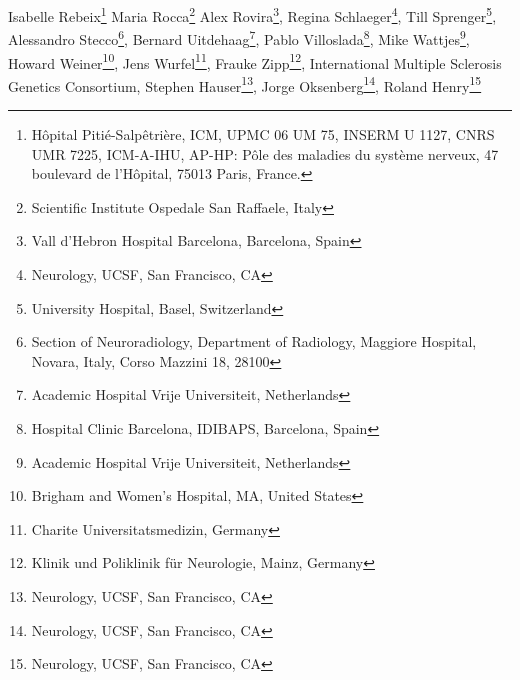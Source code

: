 Isabelle Rebeix\footnote[9]{Hôpital Pitié-Salpêtrière, ICM, UPMC 06 UM 75, INSERM U 1127, CNRS UMR 7225, ICM-A-IHU, AP-HP:  
Pôle des maladies du système nerveux, 47 boulevard de l'Hôpital, 75013  
Paris, France.}
Maria Rocca\footnote[8]{Scientific Institute Ospedale San Raffaele, Italy}
Alex Rovira\footnote[5]{Vall d’Hebron Hospital Barcelona, Barcelona, Spain},
Regina Schlaeger\footnote[1]{Neurology, UCSF, San Francisco, CA},
Till Sprenger\footnote[13]{University Hospital, Basel, Switzerland},
Alessandro Stecco\footnote[6]{Section of Neuroradiology, Department of Radiology, Maggiore Hospital, Novara, Italy, Corso Mazzini 18, 28100},
Bernard Uitdehaag\footnote[16]{Academic Hospital Vrije Universiteit, Netherlands},
Pablo Villoslada\footnote[14]{Hospital Clinic Barcelona, IDIBAPS, Barcelona, Spain},
Mike Wattjes\footnote[16]{Academic Hospital Vrije Universiteit, Netherlands},
Howard Weiner\footnote[4]{Brigham and Women's Hospital, MA, United States},
Jens Wurfel\footnote[2]{Charite Universitatsmedizin, Germany},
Frauke Zipp\footnote[10]{Klinik und Poliklinik für Neurologie, Mainz, Germany},
International Multiple Sclerosis Genetics Consortium,
Stephen Hauser\footnote[1]{Neurology, UCSF, San Francisco, CA},
Jorge Oksenberg\footnote[1]{Neurology, UCSF, San Francisco, CA},
Roland Henry\footnote[1]{Neurology, UCSF, San Francisco, CA}

\else %
\author[1]{Anisha Keshavan}
\author[2]{Friedmann Paul}
\author[3]{Mona K. Beyer}
\author[1]{Alyssa Zhu}
\author[1]{Nico Papinutto}
\author[1]{William Stern}
\author[13]{Michael Aman}
\author[4]{Rohit Bakshi}
\author[1]{Antje Bischof}
\author[6] {Alessandro Carriero}
\author[5]{Manuel Comabella}
\author[1]{Jason C. Crane}
\author[6]{Sandra D’Alfonso}
\author[7]{Benedicte Dubois}
\author[8]{Massimo Filippi}
\author[9]{Bertrand Fontaine}
\author[7]{Ann Goris}
\author[13]{Laura Gaetano}
\author[10]{Sergiu Groppa}
\author[11]{David Hafler}
\author[3]{Hanne F. Harbo}
\author[12]{Bernhard Hemmer}
\author[1]{Kesshi Jordan}
\author[13]{Ludwig Kappos}
\author[1]{Gina Kirkish}
\author[14]{Sara Llufriu}
\author[13]{Stefano Magon}
\author[8]{Filippo Martinelli-Boneschi}
\author[15]{Jacob McCauley}
\author[5]{Xavier Montalban}
\author[12]{Mark Muhlau}
\author[11]{Daniel Pelletier} %
\author[15]{Margaret Pericak-Vance}
\author[9]{Isabelle Rebeix}
\author[8]{Maria Rocca}
\author[5]{Alex Rovira}
\author[1]{Regina Schlaeger}
\author[13]{Till Sprenger} %
\author[6]{Alessandro Stecco}
\author[16]{Bernard Uitdehaag}
\author[14]{Pablo Villoslada}
\author[13]{Mike Wattjes}
\author[4]{Howard Weiner}
\author[2]{Jens Wurfel}
\author[10]{Frauke Zipp}
\author[17]{International Multiple Sclerosis Genetics Consortium}
\author[1]{Stephen Hauser}
\author[1]{Jorge Oksenberg}
\author[1]{Roland Henry}

